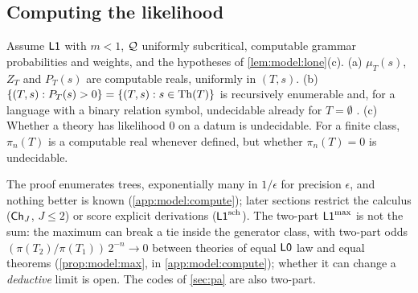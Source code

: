 \subsection{Computing the likelihood}\label{sec:model:compute}

\begin{proposition}\label{prop:model:compute}
Assume $\mathord{\mathsf{L1}}$ with $m<1$, $\mathcal{Q}$ uniformly subcritical, computable grammar probabilities and weights, and the hypotheses of \cref{lem:model:lone}(c).
(a) $\mu_T(s)$, $Z_T$ and $P_T(s)$ are computable reals, uniformly in $(T,s)$.
(b) $\{(T,s):P_T(s)>0\}=\{(T,s):s\in\mathrm{Th}(T)\}$ is recursively enumerable and, for a language with a binary relation symbol, undecidable already for $T=\emptyset$ \citep{church1936note,turing1936computable}.
(c) Whether a theory has likelihood $0$ on a datum is undecidable. For a finite class, $\pi_n(T)$ is a computable real whenever defined, but whether $\pi_n(T)=0$ is undecidable.
\end{proposition}

\noindent The proof enumerates trees, exponentially many in $1/\epsilon$ for precision $\epsilon$, and nothing better is known (\cref{app:model:compute}); later sections restrict the calculus ($\mathsf{Ch}_{J}$, $J\le2$) or score explicit derivations ($\mathord{\mathsf{L1}}^{\mathrm{sch}}$). The two-part $\mathord{\mathsf{L1}}^{\max}$ is not the sum: the maximum can break a tie inside the generator class, with two-part odds $(\pi(T_2)/\pi(T_1))\,2^{-n}\to0$ between theories of equal $\mathord{\mathsf{L0}}$ law and equal theorems (\cref{prop:model:max}, in \cref{app:model:compute}); whether it can change a \emph{deductive} limit is open. The codes of \cref{sec:pa} are also two-part.
